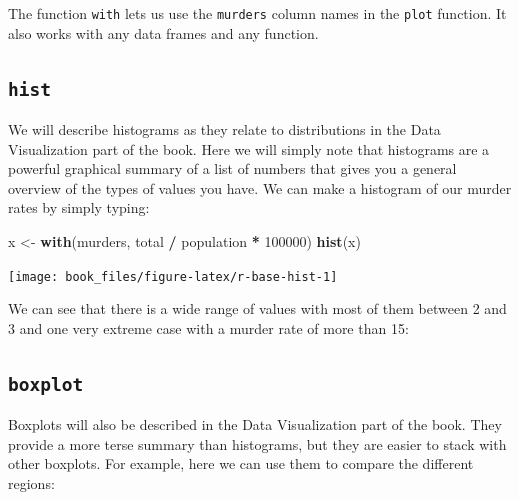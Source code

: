 \documentclass[
]{krantz}
\newenvironment{Shaded}{\begin{snugshade}}{\end{snugshade}}
\newcommand{\CommentTok}[1]{\textcolor[rgb]{0.37,0.37,0.37}{\textit{#1}}}
\newcommand{\DecValTok}[1]{\textcolor[rgb]{0.06,0.06,0.06}{#1}}
\newcommand{\KeywordTok}[1]{\textcolor[rgb]{0.27,0.27,0.27}{\textbf{#1}}}
\newcommand{\NormalTok}[1]{#1}
\newcommand{\OperatorTok}[1]{\textcolor[rgb]{0.43,0.43,0.43}{\textbf{#1}}}
\newcommand{\StringTok}[1]{\textcolor[rgb]{0.5,0.5,0.5}{#1}}
\begin{document}
The function \texttt{with} lets us use the \texttt{murders} column names in the \texttt{plot} function. It also works with any data frames and any function.

\hypertarget{hist}{%
\subsection{\texorpdfstring{\texttt{hist}}{hist}}\label{hist}}

We will describe histograms as they relate to distributions in the Data Visualization part of the book. Here we will simply note that histograms are a powerful graphical summary of a list of numbers that gives you a general overview of the types of values you have. We can make a histogram of our murder rates by simply typing:

\begin{Shaded}
\begin{Highlighting}[]
\NormalTok{x <-}\StringTok{ }\KeywordTok{with}\NormalTok{(murders, total }\OperatorTok{/}\StringTok{ }\NormalTok{population }\OperatorTok{*}\StringTok{ }\DecValTok{100000}\NormalTok{)}
\KeywordTok{hist}\NormalTok{(x)}
\end{Highlighting}
\end{Shaded}

\begin{center}\texttt{[image: book\_files/figure-latex/r-base-hist-1]} \end{center}

We can see that there is a wide range of values with most of them between 2 and 3 and one very extreme case with a murder rate of more than 15:

\begin{Shaded}
\end{Shaded}

\hypertarget{boxplot}{%
\subsection{\texorpdfstring{\texttt{boxplot}}{boxplot}}\label{boxplot}}

Boxplots will also be described in the Data Visualization part of the book. They provide a more terse summary than histograms, but they are easier to stack with other boxplots. For example, here we can use them to compare the different regions:
\end{document}

